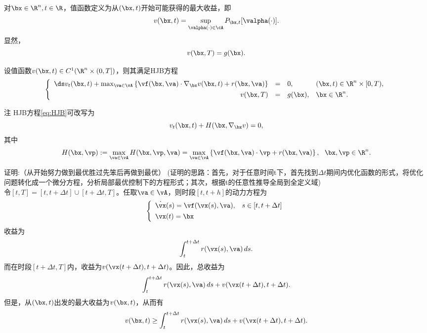 \begin{frame}{\secname}  
\small 
\begin{definition}[值函数]
对$\bx\in\R^n, t\in\R$，值函数定义为从$(\bx,t)$开始可能获得的最大收益，即
\begin{equation}
    v(\bx,t)=\sup_{\valpha(\cdot)\in\cA} P_{\bx,t}[\valpha(\cdot)].
\end{equation}
显然，
\begin{equation}
    v(\bx, T) = g(\bx). 
\end{equation}
\end{definition}
\pause 
 
\begin{theorem}
设值函数$v(\bx,t)\in C^1(\R^n\times(0,T])$，则其满足HJB方程
\begin{equation}\label{eq:HJB}
\left\{
\begin{array}{rcll}
     \ds v_t(\bx, t)  + \max_{\va\in \vA} \left\{\vf(\bx,\va)\cdot \nabla_{\bx} v(\bx,t) + r(\bx, \va)\right\} &=& 0, & (\bx,t) \in \R^n\times [0, T), \\[.05in]
     v(\bx, T)&=& g(\bx), & \bx \in \R^n.
\end{array}
\right.
\end{equation}
\end{theorem}

\pause 

\begin{alertblock}{注}
HJB方程\eqref{eq:HJB}可改写为
$$
v_t(\bx,t) + H(\bx, \nabla_\bx v) = 0, 
$$
其中
$$
H(\bx, \vp) := \max_{\va\in \vA} H(\bx,\vp,\va) = \max_{\va\in \vA} \left\{\vf(\bx,\va)\cdot \vp+ r(\bx, \va)\right\}, ~~ \bx,\vp\in\R^n.
$$
\end{alertblock}

\end{frame}

\begin{frame}{\secname}  
\begin{block}{证明:（从开始努力做到最优胜过先笨后再做到最优）}
(证明的思路：首先，对于任意时间t下，首先找到$\Delta t$期间内优化函数的形式，将优化问题转化成一个微分方程，分析局部最优控制下的方程形式；其次，根据t的任意性推导全局到全定义域)\\
令$[t, T]= [t, t+\Delta t]  \cup [t+\Delta t, T]$。任取$\va\in \vA$，则时段$[t, t+h]$的动力方程为
$$
\left\{
\begin{array}{lc}
    \dot\vx(s) = \vf(\vx(s), \va),  &  s \in [t, t+\Delta t]\\[.05in]
    \vx(t) = \bx& 
\end{array}
\right.
$$
收益为
$$
\int_{t}^{t+\Delta t} r(\vx(s), \va)\,ds. 
$$
而在时段$[t+\Delta t, T]$内，收益为$v(\vx(t+\Delta t),t+\Delta t)$。因此，总收益为
$$
\int_{t}^{t+\Delta t} r(\vx(s), \va)\,ds + v(\vx(t+\Delta t),t+\Delta t).
$$
但是，从$(\bx,t)$出发的最大收益为$v(\bx, t)$，从而有
\begin{equation}\label{eq:vv}
    v(\bx,t)\ge \int_{t}^{t+\Delta t} r(\vx(s), \va)\,ds + v(\vx(t+\Delta t),t+\Delta t). 
\end{equation}
\end{block}  
\end{frame}

